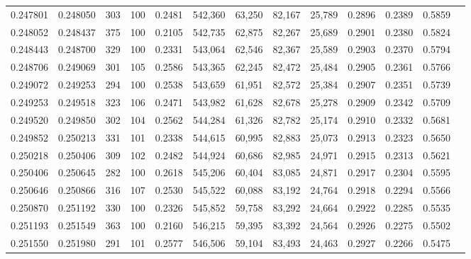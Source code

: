 \begin{tabular}{rrrrrrrrrrrrr}
0.247801 & 0.248050 &   303 & 100 &                                     0.2481 & 542,360 &  63,250 &  82,167 &  25,789 & 0.2896 & 0.2389 & 0.5859 \\
0.248052 & 0.248437 &   375 & 100 &                                     0.2105 & 542,735 &  62,875 &  82,267 &  25,689 & 0.2901 & 0.2380 & 0.5824 \\
0.248443 & 0.248700 &   329 & 100 &                                     0.2331 & 543,064 &  62,546 &  82,367 &  25,589 & 0.2903 & 0.2370 & 0.5794 \\
0.248706 & 0.249069 &   301 & 105 &                                     0.2586 & 543,365 &  62,245 &  82,472 &  25,484 & 0.2905 & 0.2361 & 0.5766 \\
0.249072 & 0.249253 &   294 & 100 &                                     0.2538 & 543,659 &  61,951 &  82,572 &  25,384 & 0.2907 & 0.2351 & 0.5739 \\
0.249253 & 0.249518 &   323 & 106 &                                     0.2471 & 543,982 &  61,628 &  82,678 &  25,278 & 0.2909 & 0.2342 & 0.5709 \\
0.249520 & 0.249850 &   302 & 104 &                                     0.2562 & 544,284 &  61,326 &  82,782 &  25,174 & 0.2910 & 0.2332 & 0.5681 \\
0.249852 & 0.250213 &   331 & 101 &                                     0.2338 & 544,615 &  60,995 &  82,883 &  25,073 & 0.2913 & 0.2323 & 0.5650 \\
0.250218 & 0.250406 &   309 & 102 &                                     0.2482 & 544,924 &  60,686 &  82,985 &  24,971 & 0.2915 & 0.2313 & 0.5621 \\
0.250406 & 0.250645 &   282 & 100 &                                     0.2618 & 545,206 &  60,404 &  83,085 &  24,871 & 0.2917 & 0.2304 & 0.5595 \\
0.250646 & 0.250866 &   316 & 107 &                                     0.2530 & 545,522 &  60,088 &  83,192 &  24,764 & 0.2918 & 0.2294 & 0.5566 \\
0.250870 & 0.251192 &   330 & 100 &                                     0.2326 & 545,852 &  59,758 &  83,292 &  24,664 & 0.2922 & 0.2285 & 0.5535 \\
0.251193 & 0.251549 &   363 & 100 &                                     0.2160 & 546,215 &  59,395 &  83,392 &  24,564 & 0.2926 & 0.2275 & 0.5502 \\
0.251550 & 0.251980 &   291 & 101 &                                     0.2577 & 546,506 &  59,104 &  83,493 &  24,463 & 0.2927 & 0.2266 & 0.5475 \\

\end{tabular}

